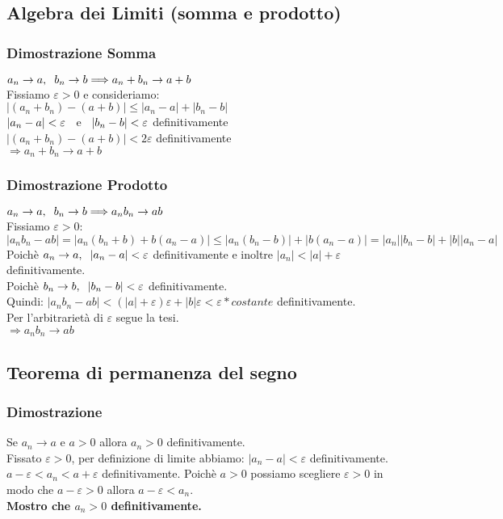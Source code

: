 \documentclass[11pt, a4paper]{article}
\begin{document}
\subsection{Algebra dei Limiti (somma e prodotto)}
\subsubsection*{Dimostrazione Somma}
$a_n \rightarrow a, \hspace{0.2cm} b_n\rightarrow b \Longrightarrow a_n+b_n \rightarrow a+b$\\
Fissiamo $\varepsilon > 0$ e consideriamo:\\
$|(a_n + b_n)-(a+b)|\leq |a_n-a|+|b_n-b|$\\
$|a_n-a|<\varepsilon \hspace{0.2cm}$ e $\hspace{0.2cm}|b_n-b|<\varepsilon$ definitivamente\\
$|(a_n+b_n)-(a+b)|<2\varepsilon$ definitivamente\\
$\Longrightarrow a_n+b_n \rightarrow a+b$
\subsubsection*{Dimostrazione Prodotto}
$a_n \rightarrow a, \hspace{0.2cm} b_n \rightarrow b \Longrightarrow a_nb_n\rightarrow ab$\\
Fissiamo $\varepsilon > 0$:\\
$|a_nb_n-ab|=|a_n(b_n+b)+b(a_n-a)|\leq|a_n(b_n-b)|+|b(a_n-a)|=|a_n||b_n-b|+|b||a_n-a|$\\
Poichè $a_n \rightarrow a, \hspace{0.2cm} |a_n-a|<\varepsilon$ definitivamente e inoltre $|a_n|<|a|+\varepsilon$ definitivamente.\\
Poichè $b_n \rightarrow b, \hspace{0.2cm} |b_n-b|<\varepsilon$ definitivamente.\\
Quindi: $|a_nb_n-ab|<(|a|+\varepsilon)\varepsilon+|b|\varepsilon<\varepsilon*costante$ definitivamente.\\
Per l'arbitrarietà di $\varepsilon$ segue la tesi.\\
$\Longrightarrow a_nb_n \rightarrow ab$

\subsection{Teorema di permanenza del segno}
\subsubsection*{Dimostrazione}
Se $a_n\rightarrow a$ e $a>0$ allora $a_n>0$ definitivamente.\\
Fissato $\varepsilon>0$, per definizione di limite abbiamo: $|a_n-a|<\varepsilon$ definitivamente.\\
$a-\varepsilon<a_n<a+\varepsilon$ definitivamente. Poichè $a>0$ possiamo scegliere $\varepsilon>0$ in modo che $a-\varepsilon>0$ allora $a-\varepsilon<a_n$.\\
\textbf{Mostro che $a_n>0$ definitivamente.}
\end{document}
